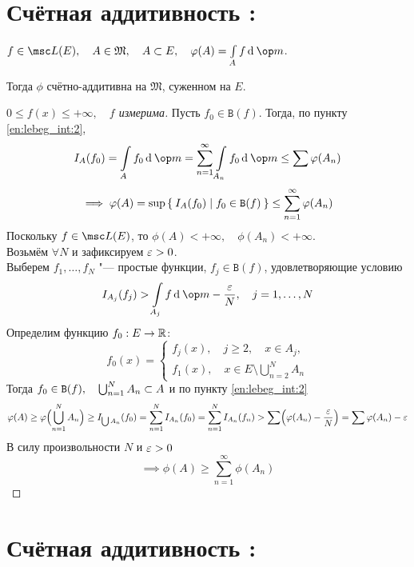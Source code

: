 \section{Счётная аддитивность : }

\begin{theorem}
	$ f \in \msc L(E), \quad A \in \mathfrak M, \quad A \sub E, \quad \phi(A) = \int\limits_A f \di \op m $.

	Тогда $ \phi $ счётно-аддитивна на $ \mathfrak M $, суженном на $ E $.
\end{theorem}

\begin{proof}[$ 0 \le f(x) \le +\infty, \quad f $ измерима]
	Пусть $ f_0 \in \mathtt B(f) $. Тогда, по пункту \ref{en:lebeg_int:2},
	$$ I_A(f_0) = \int\limits_A f_0 \di \op m = \sum_{n = 1}^\infty \int\limits_{A_n} f_0 \di \op m \le \sum \phi(A_n) $$
	$$ \implies \varphi(A) = \sup \Set{I_A(f_0) \mid f_0 \in \mathtt B(f)} \le \sum_{n = 1}^\infty \varphi(A_n) $$
	Поскольку $ f \in \msc L(E) $, то $ \phi(A) < +\infty, \quad \phi(A_n) < +\infty $. \\
	Возьмём $ \forall N $ и зафиксируем $ \varepsilon > 0 $. \\
	Выберем $ f_1, \dots, f_N $ "--- простые функции, $ f_j \in \mathtt B(f) $, удовлетворяющие условию
	$$ I_{A_j}(f_j) > \int\limits_{A_j} f \di \op m - \frac\eps N, \quad j = 1, \dots, N $$
	Определим функцию $ f_0 : E \to \mathbb{R} $:
	$$ f_0(x) =
	\begin{cases}
		f_j(x), \quad j \ge 2, \quad x \in A_j, \\
		f_1(x), \quad x \in E \setminus \bigcup_{n = 2}^N A_n
	\end{cases} $$
	Тогда $ f_0 \in \mathtt B(f), \quad \bigcup_{n = 1}^N A_n \subset A $ и по пункту \ref{en:lebeg_int:2}
	$$ \varphi(A) \ge \varphi \Bigl( \bigcup_{n = 1}^N A_n \Bigr) \ge I_{\bigcup A_n} (f_0) = \sum_{n = 1}^N I_{A_n} (f_0) = \sum_{n = 1}^N I_{A_n}(f_n) > \sum \Bigl( \varphi(A_n) - \frac{\varepsilon} N \Bigr) = \sum \varphi(A_n) - \varepsilon $$
	В силу произвольности $ N $ и $ \varepsilon > 0 $
	$$ \implies \phi(A) \ge \sum_{n = 1}^\infty \phi(A_n) $$
\end{proof}

\section{Счётная аддитивность : }


